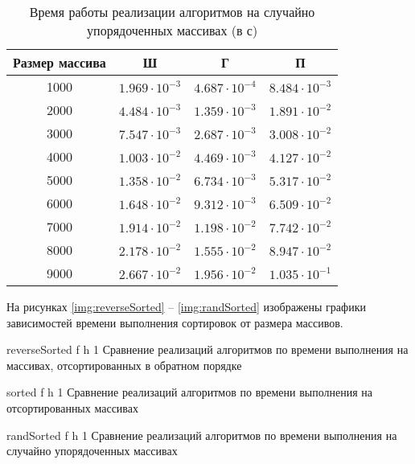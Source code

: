 \begin{table}[h]
	\begin{center}
		\begin{threeparttable}
			\captionsetup{justification=raggedright,singlelinecheck=off}
			\caption{Время работы реализации алгоритмов на случайно упорядоченных массивах (в с)}
			\label{tbl:time_measurements_rand}
			\begin{tabular}{|c|c|c|c|}
				\hline
				Размер массива &  Ш  & Г & П \\
				\hline
				1000 &$ 1.969\cdot 10^{-3} $&$ 4.687\cdot 10^{-4} $&$ 8.484\cdot 10^{-3}$\\
				\hline
				2000 &$ 4.484\cdot 10^{-3} $&$ 1.359\cdot 10^{-3} $&$ 1.891\cdot 10^{-2}$\\
				\hline
				3000 &$ 7.547\cdot 10^{-3} $&$ 2.687\cdot 10^{-3} $&$ 3.008\cdot 10^{-2}$\\
				\hline
				4000 &$ 1.003\cdot 10^{-2} $&$ 4.469\cdot 10^{-3} $&$ 4.127\cdot 10^{-2}$\\
				\hline
				5000 &$ 1.358\cdot 10^{-2} $&$ 6.734\cdot 10^{-3} $&$ 5.317\cdot 10^{-2}$\\
				\hline
				6000 &$ 1.648\cdot 10^{-2} $&$ 9.312\cdot 10^{-3} $&$ 6.509\cdot 10^{-2}$\\
				\hline
				7000 &$ 1.914\cdot 10^{-2} $&$ 1.198\cdot 10^{-2} $&$ 7.742\cdot 10^{-2}$\\
				\hline
				8000 &$ 2.178\cdot 10^{-2} $&$ 1.555\cdot 10^{-2} $&$ 8.947\cdot 10^{-2}$\\
				\hline
				9000 &$ 2.667\cdot 10^{-2} $&$ 1.956\cdot 10^{-2} $&$ 1.035\cdot 10^{-1}$\\
				\hline
			\end{tabular}
		\end{threeparttable}
	\end{center}
\end{table}

\clearpage
На рисунках \ref{img:reverseSorted} -- \ref{img:randSorted} изображены графики зависимостей времени выполнения сортировок от размера массивов.

{reverseSorted} %
{f} %
{h} %
{1\textwidth} %
{Сравнение реализаций алгоритмов по времени выполнения на массивах, отсортированных в обратном порядке} %

{sorted} %
{f} %
{h} %
{1\textwidth} %
{Сравнение реализаций алгоритмов по времени выполнения на отсортированных массивах} %

{randSorted} %
{f} %
{h} %
{1\textwidth} %
{Сравнение реализаций алгоритмов по времени выполнения на случайно упорядоченных массивах} %


